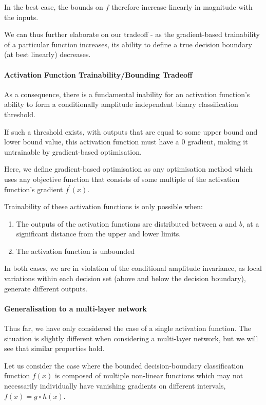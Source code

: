 \documentclass[9pt,conference]{IEEEtran}
\begin{document}
In the best case, the bounds on $f$ therefore increase linearly in magnitude with the inputs.

We can thus further elaborate on our tradeoff - as the gradient-based trainability of a particular function increases, its ability to define a true decision boundary (at best linearly) decreases.

\paragraph{Activation Function Trainability/Bounding Tradeoff}
As a consequence, there is a fundamental inability for an activation function's ability to form a conditionally amplitude independent binary classification threshold.

If such a threshold exists, with outputs that are equal to some upper bound and lower bound value, this activation function must have a 0 gradient, making it untrainable by gradient-based optimisation.

Here, we define gradient-based optimisation as any optimisation method which uses any objective function that consists of some multiple of the activation function's gradient $f^\prime\left(x\right)$.

Trainability of these activation functions is only possible when:

\begin{enumerate}
    \item The outputs of the activation functions are distributed between $a$ and $b$, at a significant distance from the upper and lower limits. 
    \item The activation function is unbounded
\end{enumerate}

In both cases, we are in violation of the conditional amplitude invariance, as local variations within each decision set (above and below the decision boundary), generate different outputs. 

\paragraph{Generalisation to a multi-layer network}

Thus far, we have only considered the case of a single activation function. The situation is slightly different when considering a multi-layer network, but we will see that similar properties hold.

Let us consider the case where the bounded decision-boundary classification function $f(x)$ is composed of multiple non-linear functions which may not necessarily individually have vanishing gradients on different intervals, $f(x)=g\circ h(x)$.
\end{document}
